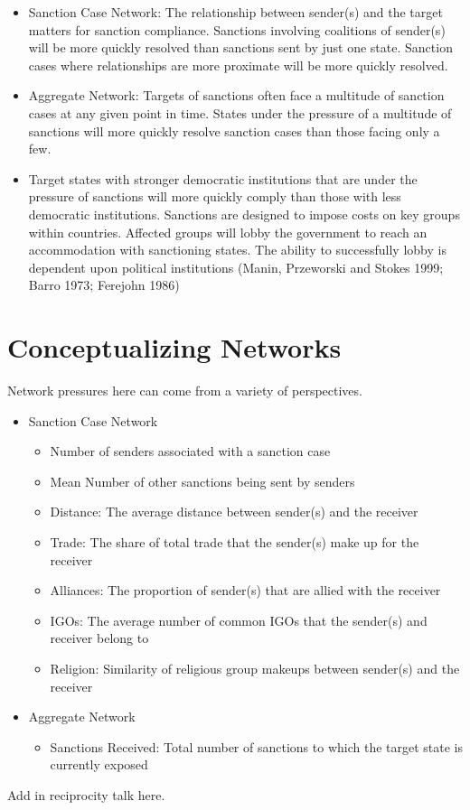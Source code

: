 \begin{itemize}
	\item Sanction Case Network: The relationship between sender(s) and the target matters for sanction compliance. Sanctions involving coalitions of sender(s) will be more quickly resolved than sanctions sent by just one state. Sanction cases where relationships are more proximate will be more quickly resolved.
	\item Aggregate Network: Targets of sanctions often face a multitude of sanction cases at any given point in time. States under the pressure of a multitude of sanctions will more quickly resolve sanction cases than those facing only a few.
	\item Target states with stronger democratic institutions that are under the pressure of sanctions will more quickly comply than those with less democratic institutions. Sanctions are designed to impose costs on key groups within countries. Affected groups will lobby the government to reach an accommodation with sanctioning states. The ability to successfully lobby is dependent upon political institutions (Manin, Przeworski and Stokes 1999; Barro 1973; Ferejohn 1986)
\end{itemize}

\section*{Conceptualizing Networks}

Network pressures here can come from a variety of perspectives. 

\begin{itemize}
	\item Sanction Case Network
	\begin{itemize}
		\item Number of senders associated with a sanction case
		\item Mean Number of other sanctions being sent by senders
		\item Distance: The average distance between sender(s) and the receiver
		\item Trade: The share of total trade that the sender(s) make up for the receiver		
		\item Alliances: The proportion of sender(s) that are allied with the receiver
		\item IGOs: The average number of common IGOs that the sender(s) and receiver belong to
		\item Religion: Similarity of religious group makeups between sender(s) and the receiver
	\end{itemize}
	\item Aggregate Network
	\begin{itemize}
		\item Sanctions Received: Total number of sanctions to which the target state is currently exposed
	\end{itemize}
\end{itemize}

Add in reciprocity talk here. 